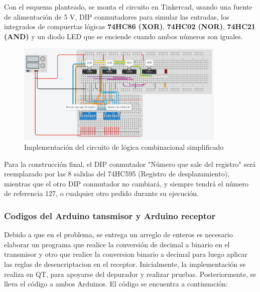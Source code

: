 \documentclass{article}
\begin{document}
Con el esquema planteado, se monta el circuito en Tinkercad, usando una fuente de alimentación de 5 V, DIP conmutadores para simular las entradas, los integrados de compuertas lógicas \textbf{74HC86 (XOR)}, \textbf{74HC02 (NOR)}, \textbf{74HC21 (AND)} y un diodo LED que se enciende cuando ambos números son iguales.\\

\begin{figure}[!ht] 
\includegraphics[width=10cm]{montajeCompuertas.PNG}
\centering
\caption{Implementación del circuito de lógica combinacional simplificado}
\end{figure}

Para la construcción final, el DIP conmutador "Número que sale del registro" será reemplazado por las 8 salidas del 74HC595 (Registro de desplazamiento), mientras que el otro DIP conmutador no cambiará, y siempre tendrá el número de referencia 127, o cualquier otro pedido durante su ejecución.
\vspace{4cm}
\subsubsection{Codigos del Arduino tansmisor y Arduino receptor}
Debido a que en el problema, se entrega un arreglo de enteros es necesario elaborar un programa que realice la conversión de decimal a binario en el transmisor y otro que realice la conversion binario a decimal para luego aplicar las reglas de desencriptacion en el receptor. Inicialmente, la implementación se realiza en QT, para apoyarse del depurador y realizar pruebas. Posteriormente, se lleva el código a ambos Arduinos. El código se encuentra a continuación:

\noindent
\end{document}
